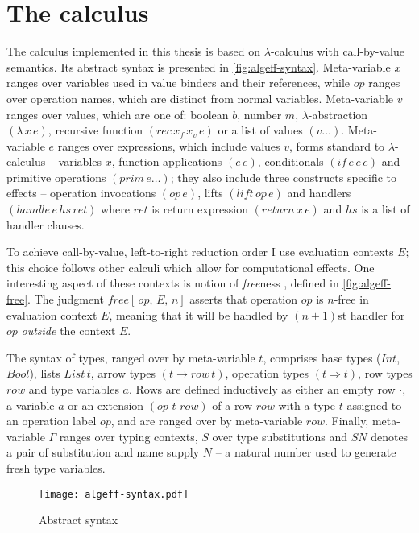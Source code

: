 \documentclass[inz, english, shortabstract]{iithesis}
\newcommand{\LC}{\(\lambda\)-calculus}
\begin{document}
\chapter{The calculus}\label{ch:calculus}
The calculus implemented in this thesis is based on \LC{} with call-by-value semantics.
Its abstract syntax is presented in \autoref{fig:algeff-syntax}.
Meta-variable $ x $ ranges over variables used in value binders and their references, while $ op $ ranges over operation names, which are distinct from normal variables.
Meta-variable $ v $ ranges over values, which are one of: boolean $ b $, number $ m $, $ \lambda $-abstraction $(\lambda \, x \, e)$, recursive function $(rec \, x_f \, x_v \, e)$ or a list of values $(v \ldots)$.
Meta-variable $ e $ ranges over expressions, which include values $ v $, forms standard to \LC{} -- variables $ x $, function applications $ (e \, e) $, conditionals $ (if \, e \,e \, e) $ and primitive operations $ (prim \, e \ldots) $; they also include three constructs specific to effects -- operation invocations $ (op \, e) $, lifts $ (lift \, op \, e) $ and handlers $ (handle \, e \, hs \, ret) $ where $ ret $ is return expression $ (return \, x \, e) $ and $ hs $ is a list of handler clauses.

To achieve call-by-value, left-to-right reduction order I use evaluation contexts $ E $; this choice follows other calculi which allow for computational effects\cite{Biernacki2017, Leijen2014, Hillerstrom2016}.
One interesting aspect of these contexts is notion of \emph{free}ness \cite{Biernacki2017}, defined in \autoref{fig:algeff-free}.
The judgment $ free[ \, op , \, E , \, n] $ asserts that operation $ op $ is $ n $-free in evaluation context $ E $, meaning that it will be handled by $(n + 1)$st handler for $ op $ \emph{outside} the context $ E $.

The syntax of types, ranged over by meta-variable $ t $, comprises base types ($Int$, $Bool$), lists $List \, t$, arrow types $(t \rightarrow row \, t)$, operation types $(t \Rightarrow t)$, row types $row$ and type variables $ a $.
Rows are defined inductively as either an empty row $\cdot$, a variable $ a $ or an extension $(op \,\, t \,\, row)$ of a row $row$ with a type $t$ assigned to an operation label $op$, and are ranged over by meta-variable $row$.
Finally, meta-variable $\Gamma$ ranges over typing contexts, $S$ over type substitutions and $SN$ denotes a pair of substitution and name supply $N$ -- a natural number used to generate fresh type variables.

\begin{figure}
  \centering
  \texttt{[image: algeff-syntax.pdf]}
  \caption{Abstract syntax}
  \label{fig:algeff-syntax}
\end{figure}
\end{document}
